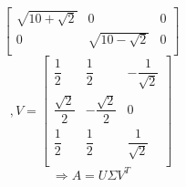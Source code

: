 \begin{qsolve}
\begin{qsolve}[]
$$\begin{bmatrix}
			\sqrt{10+\sqrt{2}} & 0 & 0 \\
			0 & \sqrt{10-\sqrt{2}} & 0 \\
		\end{bmatrix}$$ 
		$$ , V = \begin{bmatrix}
			\dfrac{1}{2} & \dfrac{1}{2} & -\dfrac{1}{\sqrt{2}} \\
			\dfrac{\sqrt{2}}{2} & -\dfrac{\sqrt{2}}{2} & 0 \\
			\dfrac{1}{2} & \dfrac{1}{2} & \dfrac{1}{\sqrt{2}} \\
		\end{bmatrix}$$
		$$\Rightarrow A = U\Sigma V^T$$
	\end{qsolve}
\end{qsolve}

